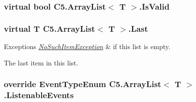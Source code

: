 \hypertarget{class_c5_1_1_array_list_a81012dc5309f8f7e24bf61b8eda60b45}{}
\subsubsection[{Is\+Valid}]{\setlength{\rightskip}{0pt plus 5cm}virtual bool {\bf C5.\+Array\+List}$<$ T $>$.Is\+Valid\hspace{0.3cm}{\ttfamily [get]}}\label{class_c5_1_1_array_list_a81012dc5309f8f7e24bf61b8eda60b45}




\hypertarget{class_c5_1_1_array_list_a520a0e6f4b6b9038bc9ad63770c78a95}{}
\subsubsection[{Last}]{\setlength{\rightskip}{0pt plus 5cm}virtual T {\bf C5.\+Array\+List}$<$ T $>$.Last\hspace{0.3cm}{\ttfamily [get]}}\label{class_c5_1_1_array_list_a520a0e6f4b6b9038bc9ad63770c78a95}





\begin{DoxyExceptions}{Exceptions}
{\em \hyperlink{class_c5_1_1_no_such_item_exception}{No\+Such\+Item\+Exception}} & if this list is empty.\\
\hline
\end{DoxyExceptions}


The last item in this list.\hypertarget{class_c5_1_1_array_list_a8560c6e1b75c9d706d2d2d2618269d4f}{}
\subsubsection[{Listenable\+Events}]{\setlength{\rightskip}{0pt plus 5cm}override {\bf Event\+Type\+Enum} {\bf C5.\+Array\+List}$<$ T $>$.Listenable\+Events\hspace{0.3cm}{\ttfamily [get]}}\label{class_c5_1_1_array_list_a8560c6e1b75c9d706d2d2d2618269d4f}




\hypertarget{class_c5_1_1_array_list_ae811cb2c92d313a6d4d54f31dd0caed5}{}
